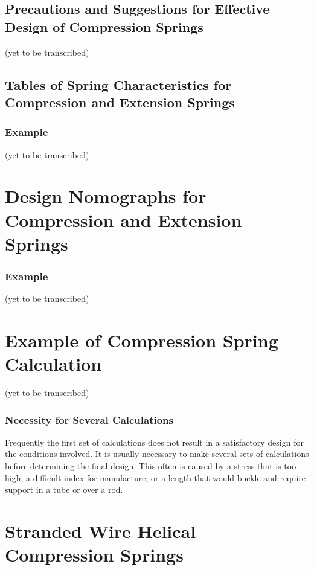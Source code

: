 \documentclass[10pt]{article}
\begin{document}
\subsection{Precautions and Suggestions for Effective Design of Compression Springs} %
(yet to be transcribed)


\subsection{Tables of Spring Characteristics for Compression and Extension Springs} %
\subsubsection{Example}
(yet to be transcribed)

\section{Design Nomographs for Compression and Extension Springs} %
\subsubsection{Example}
(yet to be transcribed)

\section{Example of Compression Spring Calculation} %
(yet to be transcribed)

\subsubsection{Necessity for Several Calculations} %
Frequently the first set of calculations does not result in a satisfactory design for the conditions involved. 
It is usually necessary to make several sets of calculations before determining the final design. 
This often is caused by a stress that is too high, a difficult index for manufacture, or a length that would buckle and require support in a tube or over a rod.

\clearpage
\section{Stranded Wire Helical Compression Springs} %
\end{document}
